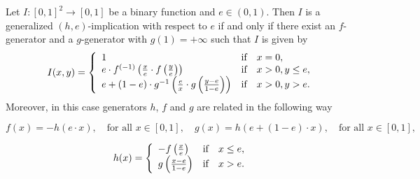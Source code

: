 \begin{theorem}\label{ThmRepresentacio(h,e)}
	Let $I:[0,1]^2 \to [0,1]$ be a binary function and $e \in (0,1)$. Then $I$ is a generalized $(h,e)$-implication with respect to $e$ if and only if there exist an $f$-generator and a $g$-generator with $g(1)=+\infty$ such that $I$ is given by
	\label{ThmRep(h,e)}
	\begin{equation}
		I(x,y) = \left\{ \begin{array}{lcl}
			1 &   \hbox{if}  & x=0, \\
			e \cdot f^{(-1)}\left(\frac{x}{e} \cdot f\left( \frac{y}{e}\right)\right)\ &  \hbox{if} & x>0,y\leq e, \\
			e+(1-e)\cdot g^{-1}\left( \frac{e}{x} \cdot g \left(\frac{y-e}{1-e}\right)\right) &  \hbox{if}  & x>0,y>e.
		\end{array}
		\right.
		\label{eq4}
	\end{equation}
	Moreover, in this case generators $h$, $f$ and $g$ are related in the following way
	
	$$f(x)=-h(e\cdot x), \quad \text{for all } x \in [0,1], \quad g(x)=h(e+(1-e)\cdot x), \quad \text{for all } x \in [0,1],$$
	
	$$ h(x) =  \left\{ \begin{array}{lcl}
		-f\left(\frac{x}{e} \right) &   \hbox{if}  & x \leq e, \\
		g\left(\frac{x-e}{1-e}\right) &  \hbox{if} & x>e.
	\end{array}
	\right.
	$$
\end{theorem}

